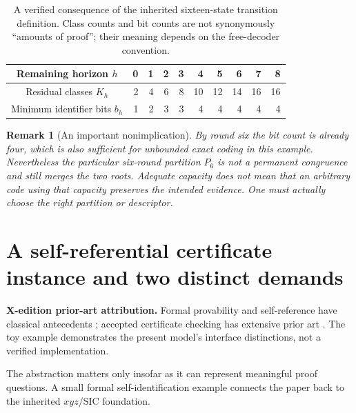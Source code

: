 \documentclass[11pt,letterpaper]{article}
\newcommand{\PriorArtNote}[1]{%
\par\smallskip\noindent\begin{minipage}{\linewidth}\small\color{black!85}%
\textbf{X-edition prior-art attribution.} #1\end{minipage}\par\smallskip}
\newtheorem{remark}[theorem]{Remark}
\begin{document}
\begin{table}[htbp]\centering\small
\begin{tabular}{c|rrrrrrrrr}
\toprule
Remaining horizon $h$ &0&1&2&3&4&5&6&7&8\\\midrule
Residual classes $K_h$ &2&4&6&8&10&12&14&16&16\\
Minimum identifier bits $b_h$ &1&2&3&3&4&4&4&4&4\\\bottomrule
\end{tabular}
\caption{A verified consequence of the inherited sixteen-state transition definition. Class counts and bit counts are not synonymously ``amounts of proof''; their meaning depends on the free-decoder convention.}
\end{table}

\begin{remark}[An important nonimplication]\label{rem:six}
By round six the bit count is already four, which is also sufficient for \emph{unbounded} exact coding in this example. Nevertheless the \emph{particular} six-round partition $P_6$ is not a permanent congruence and still merges the two roots. Adequate capacity does not mean that an arbitrary code using that capacity preserves the intended evidence. One must actually choose the right partition or descriptor.
\end{remark}

\section{A self-referential certificate instance and two distinct demands}
\PriorArtNote{Formal provability and self-reference have classical antecedents \cite{godel,lob}; accepted certificate checking has extensive prior art \cite{necula,besson}. The toy example demonstrates the present model's interface distinctions, not a verified implementation.}
The abstraction matters only insofar as it can represent meaningful proof questions. A small formal self-identification example connects the paper back to the inherited $xyz$/SIC foundation.
\end{document}
